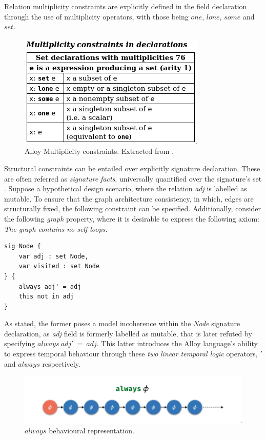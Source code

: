 Relation multiplicity constraints are explicitly defined in the field declaration through the use of multiplicity operators, with those being $one$, $lone$, $some$ and $set$.

\begin{figure}[H]
    \centering
    \includegraphics[width=0.4\linewidth]{images/alloy_multiplicity.png}
    \caption{Alloy Multiplicity constraints. Extracted from \cite{alloy-qr}.} 
    \label{fig:alloy-multiplicity}
\end{figure}


Structural constraints can be entailed over explicitly signature declaration. These are often referred as \textit{signature facts}, universally quantified over the signature's set \cite{alloy-qr}. Suppose a hypothetical design scenario, where the relation \textit{adj} is labelled as mutable. To ensure that the graph architecture consistency, in which, edges are structurally fixed, the following constraint can be specified. Additionally, consider the following \textit{graph} property, where it is desirable to express the following axiom: \textit{The graph contains no self-loops.}

\begin{lstlisting}[title={\textit{Node} hypothetical constraints over the signature definition.}, otherkeywords = {abstract, sig, module, var, set, fact, extends, no, in, this, not, always, \', \=}, floatplacement=H]
sig Node {
    var adj : set Node, 
    var visited : set Node
} {
    always adj' = adj
    this not in adj
}
\end{lstlisting}

As stated, the former poses a model incoherence within the \textit{Node} signature declaration, as \textit{adj} field is formerly labelled as mutable, that is later refuted by specifying $always \ adj'\ =\ adj$. This latter introduces the Alloy language's ability to express temporal behaviour through these \textit{two} \textit{linear temporal logic} operators, $'$ and $always$ respectively. 

\begin{figure}[H]
    \centering
    \includegraphics[width=0.7\linewidth]{images/alloy_always.png}
    \caption{$always$ behavioural representation.}
    \label{fig:alloy-always}
\end{figure}

